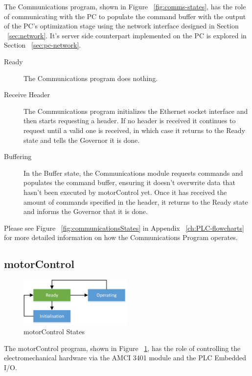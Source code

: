 	The Communications program, shown in Figure ~\ref{fig:comms-states}, has the role of communicating with the PC to populate the command buffer with the output of the PC's optimization stage using the network interface designed in Section ~\ref{sec:network}. It's server side counterpart implemented on the PC is explored in Section ~\ref{sec:pc-network}.

	
			\begin{description}
				\item[Ready] The Communications program does nothing.
				\item[Receive Header] The Communications program initializes the Ethernet socket interface and then starts requesting a header. If no header is received it continues to request until a valid one is received, in which case it returns to the Ready state and tells the Governor it is done.
				\item[Buffering] In the Buffer state, the Communications module requests commands and populates the command buffer, ensuring it doesn't overwrite data that hasn't been executed by motorControl yet. Once it has received the amount of commands specified in the header, it returns to the Ready state and informs the Governor that it is done.
			\end{description}
			
		Please see Figure ~\ref{fig:communicationsStates} in Appendix ~\ref{ch:PLC-flowcharts} for more detailed information on how the Communications Program operates.


\subsection{motorControl}

			\begin{figure}[h]
				\centering
				\includegraphics[width=0.5\textwidth]{figures/cncMachine/motorControl_simple.png}
				\caption{motorControl States}
				\label{fig:motorcontrol-states}
			\end{figure}
	
	The motorControl program, shown in Figure ~\ref{fig:motorcontrol-states}, has the role of controlling the electromechanical hardware via the AMCI 3401 module and the PLC Embedded I/O. 
	
